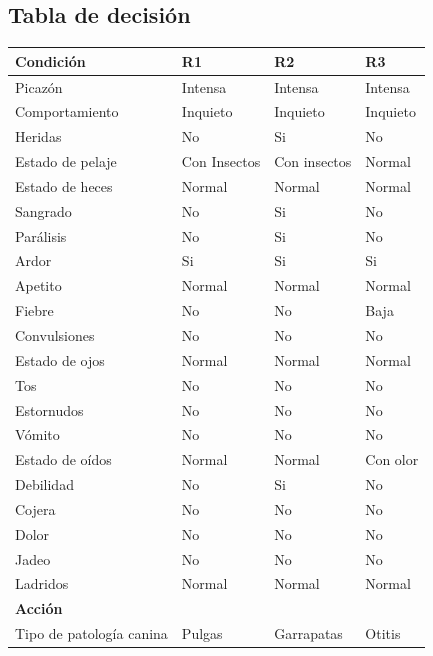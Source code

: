 \documentclass[a4paper,table,xcdraw]{article}
\begin{document}
\subsection{Tabla de decisión}
\begin{table}[H]
\centering
\begin{tabular}{|l|l|l|l|}
\hline
\textbf{Condición}       & R1 & R2 & R3 \\ \hline
Picazón & Intensa & Intensa & Intensa   \\ \hline
Comportamiento & Inquieto & Inquieto   & Inquieto    \\ \hline
Heridas & No  &  Si  & No   \\ \hline
Estado de pelaje & Con Insectos & Con insectos   & Normal    \\ \hline
Estado de heces &  Normal  & Normal    & Normal    \\ \hline
Sangrado & No &  Si  & No   \\ \hline
Parálisis & No & Si & No   \\ \hline
Ardor & Si & Si    & Si    \\ \hline
Apetito & Normal & Normal    & Normal    \\ \hline
Fiebre & No & No   & Baja    \\ \hline
Convulsiones & No & No   & No    \\ \hline
Estado de ojos & Normal & Normal   & Normal    \\ \hline
Tos & No & No   & No    \\ \hline
Estornudos & No & No   & No    \\ \hline
Vómito & No & No   & No    \\ \hline
Estado de oídos & Normal & Normal   & Con olor    \\ \hline
Debilidad & No & Si   & No   \\ \hline
Cojera & No & No   & No    \\ \hline
Dolor & No & No   & No   \\ \hline
Jadeo & No & No  & No   \\ \hline
Ladridos & Normal & Normal   & Normal   \\ \hline
\textbf{Acción}          &    &    &    \\ \hline
Tipo de patología canina & Pulgas & Garrapatas & Otitis \\ \hline
\end{tabular}
\end{table}
\end{document}
